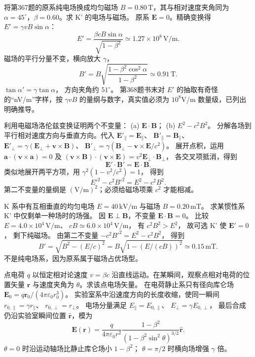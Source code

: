 将第367题的原系纯电场换成均匀磁场 $B=0.80\,\mathrm T$，其与相对速度夹角同为 $\alpha=45^\circ$，$\beta=0.60$。求 K' 的电场与磁场。
\exsolution
原系 $\bm E=0$。精确变换得
$E'=\gamma vB\sin\alpha$：
\[
\boxed{E'=\frac{\beta c B\sin\alpha}
{\sqrt{1-\beta^2}}
\simeq1.27\times10^8\,\mathrm{V/m}}.
\]
磁场的平行分量不变，横向放大 $\gamma$，
\[
\boxed{B'=B
\sqrt{\frac{1-\beta^2\cos^2\alpha}{1-\beta^2}}
\simeq0.91\,\mathrm T}.
\]
$\tan\alpha'=\gamma\tan\alpha$，
方向夹角约 $51^\circ$。
\excheck 第368题书末对 $E'$ 的抽取有奇怪的“nV/m”字样，按 $\gamma vB$ 的量纲与数字，真实值必须为 $10^8$V/m 数量级，已列出明确推导。

利用电磁场洛伦兹变换证明两个不变量：
(a) $\bm E\cdot\bm B$；
(b) $E^2-c^2B^2$。
\exsolution
分解各场到平行相对速度方向与垂直方向。代入
$\bm E'_\parallel=\bm E_\parallel$、
$\bm B'_\parallel=\bm B_\parallel$、
$\bm E'_\perp=\gamma(\bm E_\perp+\bm v\times\bm B)$、
$\bm B'_\perp=\gamma(\bm B_\perp-\bm v\times\bm E/c^2)$。
展开点积，运用
$\bm a\cdot(\bm v\times\bm a)=0$
及
$(\bm v\times\bm B)\cdot(\bm v\times\bm E)
=v^2\bm E_\perp\cdot\bm B_\perp$，
各交叉项抵消，得到
\[
\boxed{\bm E'\cdot\bm B'=\bm E\cdot\bm B}.
\]
类似地展开两平方项，用
$\gamma^2(1-v^2/c^2)=1$，
得到
\[
\boxed{E'^2-c^2B'^2=E^2-c^2B^2}.
\]
\excheck 第二不变量的量纲是 $(\mathrm{V/m})^2$；必须给磁场项乘 $c^2$ 才能相减。

K 系中有互相垂直的均匀电场
$E=40\,\mathrm{kV/m}$ 与磁场
$B=0.20\,\mathrm{mT}$。
求某惯性系 K' 中仅剩单一种场时的场强。
\exsolution
因 $\bm E\perp\bm B$，不变量
$\bm E\cdot\bm B=0$。
比较
$E=4.0\times10^4\,\mathrm{V/m}$、
$cB\simeq6.0\times10^4\,\mathrm{V/m}$，
有 $c^2B^2>E^2$，
故可选 K' 使 $\bm E'=0$，
剩下纯磁场。
由第二不变量
$-c^2B'^2=E^2-c^2B^2$，
得到
\[
\boxed{B'=\sqrt{B^2-(E/c)^2}
=B\sqrt{1-(E/(cB))^2}
\simeq0.15\,\mathrm{mT}}.
\]
\excheck 不是纯电场系，因为原系属于磁场占优场型。

点电荷 $q$ 以恒定相对论速度 $v=\beta c$ 沿直线运动。在某瞬间，观察点相对电荷的位置矢量 $\bm r$ 与速度夹角为 $\theta$。求该点电场矢量。
\exsolution
在电荷静止系只有径向库仑场
$\bm E_0=q\bm r_0/(4\pi\varepsilon_0r_0^3)$。
实验室系中沿速度方向的长度收缩，使同一瞬间
$r_{0,\parallel}=\gamma r_\parallel$、
$r_{0,\perp}=r_\perp$。
电场分量满足
$E_\parallel=E_{0,\parallel}$、
$E_\perp=\gamma E_{0,\perp}$，
最后合成仍沿实验室瞬间位置 $\hat{\bm r}$，模为
\[
\boxed{\bm E(\bm r)=
\frac{q}{4\pi\varepsilon_0r^2}
\frac{1-\beta^2}{(1-\beta^2\sin^2\theta)^{3/2}}
\hat{\bm r}}.
\]
\excheck $\theta=0$ 时沿运动轴场比静止库仑场小 $1-\beta^2$；
$\theta=\pi/2$ 时横向场增强 $\gamma$ 倍。
